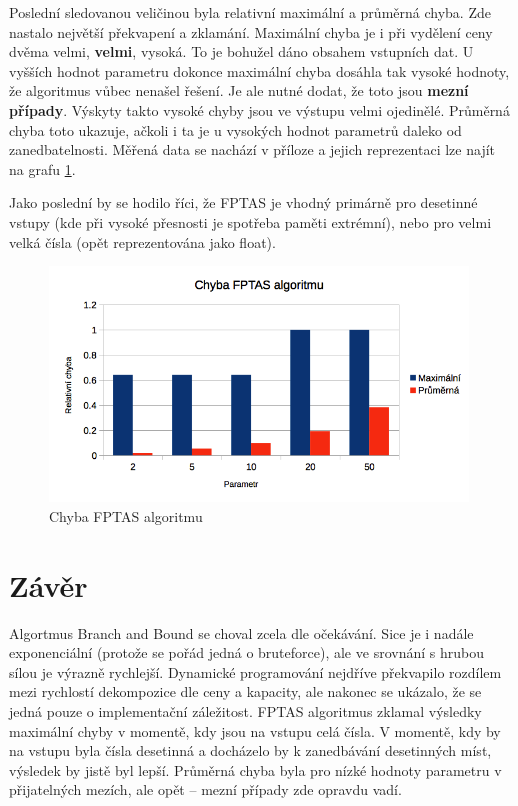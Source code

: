 \documentclass[a4paper]{article}
\begin{document}
	Poslední sledovanou veličinou byla relativní maximální a průměrná chyba. Zde nastalo největší překvapení a zklamání. Maximální chyba je i při vydělení ceny dvěma velmi, \textbf{velmi}, vysoká. To je bohužel dáno obsahem vstupních dat. U vyšších hodnot parametru dokonce maximální chyba dosáhla tak vysoké hodnoty, že algoritmus vůbec nenašel řešení. Je ale nutné dodat, že toto jsou \textbf{mezní případy}. Výskyty takto vysoké chyby jsou ve výstupu velmi ojedinělé. Průměrná chyba toto ukazuje, ačkoli i ta je u vysokých hodnot parametrů daleko od zanedbatelnosti. Měřená data se nachází v příloze a jejich reprezentaci lze najít na grafu \ref{fptas-error}.
	
	Jako poslední by se hodilo říci, že FPTAS je vhodný primárně pro desetinné vstupy (kde při vysoké přesnosti je spotřeba paměti extrémní), nebo pro velmi velká čísla (opět reprezentována jako float).
	
	\begin{figure}[h]\centering
		\includegraphics[width=0.99\textwidth]{chybaFPTAS.png} 
		\caption{Chyba FPTAS algoritmu}
		\label{fptas-error}
	\end{figure}
	



\section{Závěr}
	Algortmus Branch and Bound se choval zcela dle očekávání. Sice je i nadále exponenciální (protože se pořád jedná o bruteforce), ale ve srovnání s hrubou sílou je výrazně rychlejší. Dynamické programování nejdříve překvapilo rozdílem mezi rychlostí dekompozice dle ceny a kapacity, ale nakonec se ukázalo, že se jedná pouze o implementační záležitost.
	FPTAS algoritmus zklamal výsledky maximální chyby v momentě, kdy jsou na vstupu celá čísla. V momentě, kdy by na vstupu byla čísla desetinná a docházelo by k zanedbávání desetinných míst, výsledek by jistě byl lepší. Průměrná chyba byla pro nízké hodnoty parametru v přijatelných mezích, ale opět -- mezní případy zde opravdu vadí.
\end{document}
